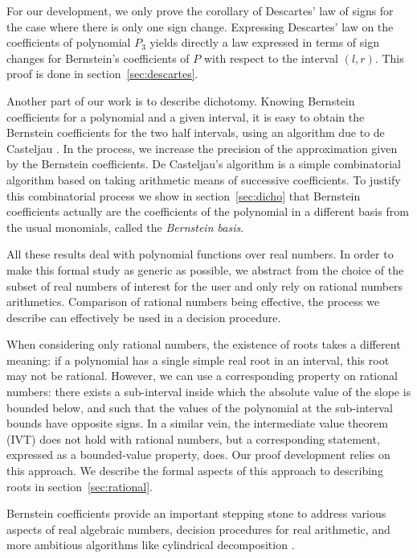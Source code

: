 \documentclass{mscs}
\begin{document}
For our development, we only prove the corollary  of
Descartes' law of signs for the case where there is only one sign
change.  Expressing Descartes' law on the coefficients of polynomial
\(P_3\) yields directly a law expressed in terms of sign changes for
Bernstein's coefficients of \(P\) with respect to the
interval
\((l,r)\).   This proof is done in section~\ref{sec:descartes}.

Another part of our work is to describe dichotomy.  Knowing Bernstein
coefficients for a polynomial and a given interval, it is easy to
obtain the Bernstein coefficients for the two half intervals, using
an algorithm due to de Casteljau \cite{castel}.  In the process, we increase
the precision of the approximation given by the Bernstein
coefficients.  De Casteljau's algorithm is a simple combinatorial
algorithm based on taking arithmetic means of successive coefficients.
To justify this combinatorial process we show in
section~\ref{sec:dicho} that Bernstein
coefficients actually are the coefficients of the polynomial in a
different basis from the usual monomials, called the {\em Bernstein basis}.

All these results deal with polynomial functions over real numbers. In
order to make this formal study as generic as possible, we abstract
from the choice of the subset of real numbers of interest for the
user and only rely on rational numbers arithmetics. Comparison of
rational numbers being effective, the process we describe can
effectively be used in a decision procedure.

When considering only rational numbers, the existence of roots takes a
different meaning: if a polynomial has a single simple real root in an
interval, this root may not be rational.  However, we can use a
corresponding property on rational numbers: there exists a
sub-interval inside which the absolute value of the slope is bounded
below, and such that the values of the polynomial at the sub-interval
bounds have opposite signs.  In a similar vein, the intermediate value
theorem (IVT) does not hold with rational numbers, but a corresponding
statement, expressed as a bounded-value property, does.  Our proof
development relies on this approach.  We describe the formal aspects
of this approach to describing roots in section~\ref{sec:rational}.

Bernstein coefficients provide an important stepping stone
to address various aspects of real algebraic numbers, decision
procedures for real arithmetic, and more ambitious algorithms like
cylindrical decomposition \cite{bpr, cadcoq}.
\end{document}
